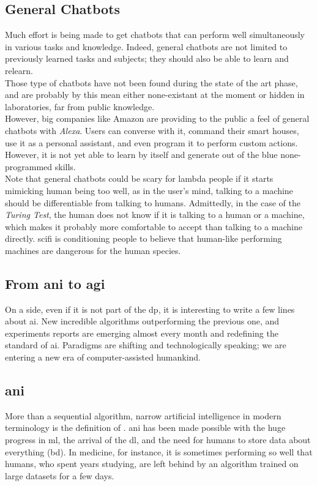\subsection{General Chatbots}
\label{sota:chatbots-general}
Much effort is being made to get chatbots that can perform well simultaneously in various tasks and knowledge. Indeed, general chatbots are not limited to previously learned tasks and subjects; they should also be able to learn and relearn.\\

Those type of chatbots have not been found during the state of the art phase, and are probably by this mean either none-existant at the moment or hidden in laboratories, far from public knowledge. \\

However, big companies like Amazon are providing to the public a feel of general chatbots with \textit{Alexa}\cite{chatbot:alexa}. Users can converse with it, command their smart houses, use it as a personal assistant, and even program it to perform custom actions. However, it is not yet able to learn by itself and generate out of the blue none-programmed skills.\\

Note that general chatbots could be scary for lambda people if it starts mimicking human being too well, as in the user's mind, talking to a machine should be differentiable from talking to humans. Admittedly, in the case of the \textit{Turing Test}\cite{paper:turing}, the human does not know if it is talking to a human or a machine, which makes it probably more comfortable to accept than talking to a machine directly. \gls{scifi} is conditioning people to believe that human-like performing machines are dangerous for the human species.


\subsection{From \gls{ani} to \gls{agi}}
On a side, even if it is not part of the \gls{dp}, it is interesting to write a few lines about \gls{ai}. New incredible algorithms outperforming the previous one, and experiments reports are emerging almost every month and redefining the standard of \gls{ai}. Paradigms are shifting and technologically speaking; we are entering a new era of computer-assisted humankind.

\subsection{\gls{ani}}
More than a sequential algorithm, narrow artificial intelligence in modern terminology is the definition of . \gls{ani} has been made possible with the huge progress in \gls{ml}, the arrival of the \gls{dl}, and the need for humans to store data about everything (\gls{bd}). In medicine, for instance, it is sometimes performing so well that humans, who spent years studying, are left behind by an algorithm trained on large datasets for a few days.

